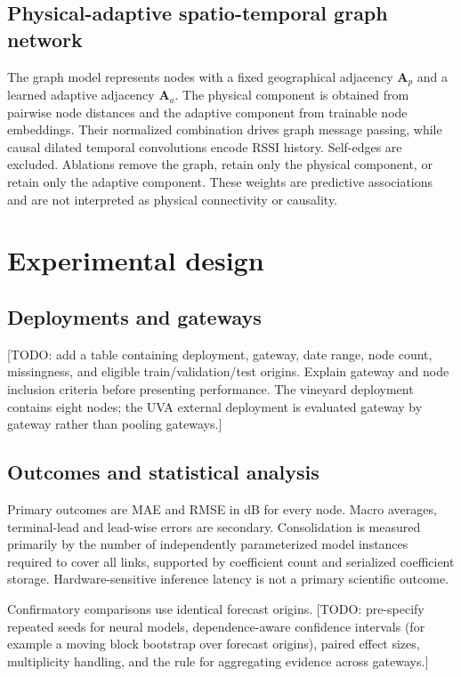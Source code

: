 \documentclass[preprint,12pt]{elsarticle}
\begin{document}
\subsection{Physical-adaptive spatio-temporal graph network}
The graph model represents nodes with a fixed geographical adjacency
$\mathbf{A}_{p}$ and a learned adaptive adjacency $\mathbf{A}_{a}$. The physical
component is obtained from pairwise node distances and the adaptive component from
trainable node embeddings. Their normalized combination drives graph message passing,
while causal dilated temporal convolutions encode RSSI history. Self-edges are
excluded. Ablations remove the graph, retain only the physical component, or retain
only the adaptive component. These weights are predictive associations and are not
interpreted as physical connectivity or causality.

\section{Experimental design}
\subsection{Deployments and gateways}
[TODO: add a table containing deployment, gateway, date range, node count, missingness,
and eligible train/validation/test origins. Explain gateway and node inclusion criteria
before presenting performance. The vineyard deployment contains eight nodes; the UVA
external deployment is evaluated gateway by gateway rather than pooling gateways.]

\subsection{Outcomes and statistical analysis}
Primary outcomes are MAE and RMSE in dB for every node. Macro averages, terminal-lead
and lead-wise errors are secondary. Consolidation is measured primarily by the number
of independently parameterized model instances required to cover all links, supported
by coefficient count and serialized coefficient storage. Hardware-sensitive inference
latency is not a primary scientific outcome.

Confirmatory comparisons use identical forecast origins. [TODO: pre-specify repeated
seeds for neural models, dependence-aware confidence intervals (for example a moving
block bootstrap over forecast origins), paired effect sizes, multiplicity handling,
and the rule for aggregating evidence across gateways.]
\end{document}
